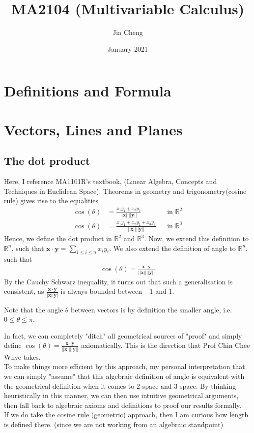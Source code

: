 \documentclass{article}
\title{MA2104 (Multivariable Calculus)}
\author{Jia Cheng}
\date{January 2021}
\begin{document}
\maketitle

\section{Definitions and Formula}


\section{Vectors, Lines and Planes}
\subsection{The dot product}
Here, I reference MA1101R's textbook, (Linear Algebra, Concepts and Techniques in Euclidean Space).
Theorems in geometry and trigonometry(cosine rule) gives rise to the equalities
\begin{align*}
	\cos(\theta) &= \frac{x_1y_1+x_2y_2}{||\mathbf{x}||||\mathbf{y}||} &&\text{in } \mathbb{R}^2\\
	\cos(\theta) &= \frac{x_1y_1+x_2y_2+x_3y_3}{||\mathbf{x}||||\mathbf{y}||} &&\text{in } \mathbb{R}^3
\end{align*} 
Hence, we define the dot product in $\mathbb{R}^2$ and $\mathbb{R}^3$. Now, we extend this definition to $\mathbb{R}^n$, such that $\mathbf{x}\cdot \mathbf{y} = \sum_{1\leq i\leq n}x_iy_i$. We also extend the definition of angle to $\mathbb{R}^n$, such that 
\begin{align*}
	\cos(\theta) = \frac{\mathbf{x}\cdot \mathbf{y}}{||\mathbf{x}||||\mathbf{y}||}
\end{align*}
By the Cauchy Schwarz inequality, it turns out that such a generalisation is consistent, as $\frac{\mathbf{x}\cdot \mathbf{y}}{|\mathbf{x}||\mathbf{y}|}$ is always bounded between $-1$ and $1$.

Note that the angle $\theta$ between vectors is by definition the smaller angle, i.e. $0\leq \theta \leq \pi$.

In fact, we can completely "ditch" all geometrical sources of "proof" and simply define $\cos(\theta) = \frac{\mathbf{x}\cdot \mathbf{y}}{||\mathbf{x}||||\mathbf{y}||}$ axiomatically. This is the direction that Prof Chin Chee Whye takes.\\
To make things more efficient by this approach, my personal interpretation that we can simply "assume" that this algebraic definition of angle is equivalent with the geometrical definition when it comes to 2-space and 3-space. By thinking heuristically in this manner, we can then use intuitive geometrical arguments, then fall back to algebraic axioms and definitions to proof our results formally.\\
If we do take the cosine rule (geometric) approach, then I am curious how length is defined there. (since we are not working from an algebraic standpoint)
\end{document}
